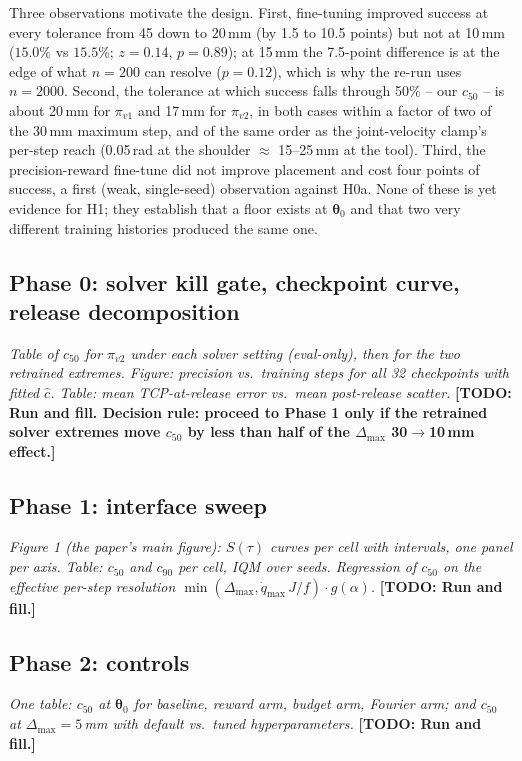 \documentclass{article}
\newcommand{\todo}[1]{{\color{red}\textbf{[TODO: #1]}}}
\newcommand{\planned}[1]{{\color{blue!70!black}\textit{#1}}}
\newcommand{\dmax}{\Delta_{\max}}
\newcommand{\qdmax}{\dot q_{\max}}
\newcommand{\iface}{\boldsymbol{\theta}}
\begin{document}
Three observations motivate the design. First, fine-tuning improved success at every tolerance from 45 down to 20\,mm (by 1.5 to 10.5 points) but not at 10\,mm ($15.0\%$ vs $15.5\%$; $z{=}0.14$, $p{=}0.89$); at 15\,mm the 7.5-point difference is at the edge of what $n{=}200$ can resolve ($p{=}0.12$), which is why the re-run uses $n{=}2000$. Second, the tolerance at which success falls through 50\% -- our $c_{50}$ -- is about 20\,mm for $\pi_{v1}$ and 17\,mm for $\pi_{v2}$, in both cases within a factor of two of the 30\,mm maximum step, and of the same order as the joint-velocity clamp's per-step reach (0.05\,rad at the shoulder $\approx$ 15--25\,mm at the tool). Third, the precision-reward fine-tune did not improve placement and cost four points of success, a first (weak, single-seed) observation against H0a. None of these is yet evidence for H1; they establish that a floor exists at $\iface_0$ and that two very different training histories produced the same one.

\subsection{Phase 0: solver kill gate, checkpoint curve, release decomposition}
\planned{Table of $c_{50}$ for $\pi_{v2}$ under each solver setting (eval-only), then for the two retrained extremes. Figure: precision vs.\ training steps for all 32 checkpoints with fitted $\hat c$. Table: mean TCP-at-release error vs.\ mean post-release scatter.}
\todo{Run and fill. Decision rule: proceed to Phase 1 only if the retrained solver extremes move $c_{50}$ by less than half of the $\dmax$ 30$\to$10\,mm effect.}

\subsection{Phase 1: interface sweep}
\planned{Figure 1 (the paper's main figure): $S(\tau)$ curves per cell with intervals, one panel per axis. Table: $c_{50}$ and $c_{90}$ per cell, IQM over seeds. Regression of $c_{50}$ on the effective per-step resolution $\min(\dmax, \qdmax\,J/f)\cdot g(\alpha)$.}
\todo{Run and fill.}

\subsection{Phase 2: controls}
\planned{One table: $c_{50}$ at $\iface_0$ for baseline, reward arm, budget arm, Fourier arm; and $c_{50}$ at $\dmax{=}5$\,mm with default vs.\ tuned hyperparameters.}
\todo{Run and fill.}
\end{document}
